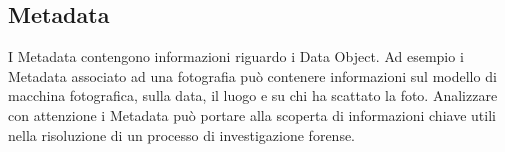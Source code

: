 \subsection{Metadata}
I Metadata contengono informazioni riguardo i Data Object. Ad esempio i Metadata associato ad una fotografia può contenere informazioni sul modello di macchina fotografica, sulla data, il luogo e su chi ha scattato la foto.
Analizzare con attenzione i Metadata può portare alla scoperta di informazioni chiave utili nella risoluzione di un processo di investigazione forense.